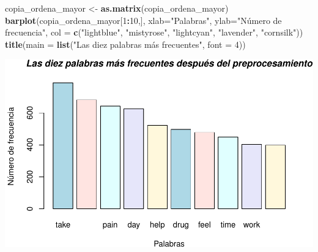 \documentclass[spanish,]{article}
\newenvironment{Shaded}{\begin{snugshade}}{\end{snugshade}}
\newcommand{\KeywordTok}[1]{\textcolor[rgb]{0.13,0.29,0.53}{\textbf{#1}}}
\newcommand{\DataTypeTok}[1]{\textcolor[rgb]{0.13,0.29,0.53}{#1}}
\newcommand{\DecValTok}[1]{\textcolor[rgb]{0.00,0.00,0.81}{#1}}
\newcommand{\StringTok}[1]{\textcolor[rgb]{0.31,0.60,0.02}{#1}}
\newcommand{\OperatorTok}[1]{\textcolor[rgb]{0.81,0.36,0.00}{\textbf{#1}}}
\newcommand{\NormalTok}[1]{#1}
\begin{document}
\begin{Shaded}
\begin{Highlighting}[]
\NormalTok{copia_ordena_mayor <-}\StringTok{ }\KeywordTok{as.matrix}\NormalTok{(copia_ordena_mayor)}
\KeywordTok{barplot}\NormalTok{(copia_ordena_mayor[}\DecValTok{1}\OperatorTok{:}\DecValTok{10}\NormalTok{,],  }\DataTypeTok{xlab=}\StringTok{"Palabras"}\NormalTok{, }\DataTypeTok{ylab=}\StringTok{"Número de frecuencia"}\NormalTok{,}
        \DataTypeTok{col =} \KeywordTok{c}\NormalTok{(}\StringTok{"lightblue"}\NormalTok{, }\StringTok{"mistyrose"}\NormalTok{, }\StringTok{"lightcyan"}\NormalTok{,}
                \StringTok{"lavender"}\NormalTok{, }\StringTok{"cornsilk"}\NormalTok{))}
\KeywordTok{title}\NormalTok{(}\DataTypeTok{main =} \KeywordTok{list}\NormalTok{(}\StringTok{"Las diez palabras más frecuentes"}\NormalTok{, }\DataTypeTok{font =} \DecValTok{4}\NormalTok{))}
\end{Highlighting}
\end{Shaded}

\includegraphics{practica_files/figure-latex/unnamed-chunk-37-1.pdf}
\end{document}
